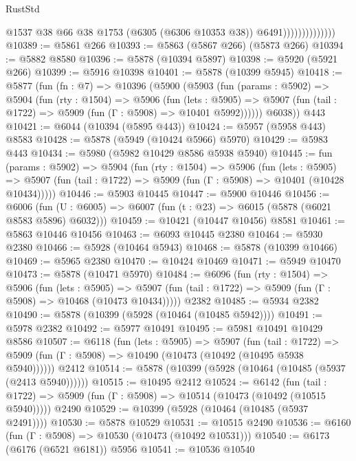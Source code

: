 \begin{lexlean}{RustStd}
\begin{coremodule}
                                @1537
                                @38
                                @66
                                @38
                                @1753
                                (@6305 (@6306 @10353 @38))
                                @6491))))))))))))))
@10389 := @5861 @266
@10393 := @5863 (@5867 @266) (@5873 @266)
@10394 := @5882 @8580
@10396 := @5878 (@10394 @5897)
@10398 := @5920 (@5921 @266)
@10399 := @5916 @10398
@10401 := @5878 (@10399 @5945)
@10418 := @5877
    (fun (fn : @7) =>
    @10396
      (@5900
        (@5903
          (fun (params : @5902) =>
          @5904
            (fun (rty : @1504) =>
            @5906
              (fun (lets : @5905) =>
              @5907 (fun (tail : @1722) => @5909 (fun (Γ : @5908) => @10401 @5992))))))
        @6038))
    @443
@10421 := @6044 (@10394 (@5895 @443))
@10424 := @5957 (@5958 @443) @8583
@10428 := @5878 (@5949 (@10424 @5966) @5970)
@10429 := @5983 @443
@10434 := @5980 (@5982 @10429 @8586 @5938 @5940)
@10445 := fun (params : @5902) =>
  @5904
    (fun (rty : @1504) =>
    @5906
      (fun (lets : @5905) =>
      @5907 (fun (tail : @1722) => @5909 (fun (Γ : @5908) => @10401 (@10428 @10434)))))
@10446 := @5903 @10445
@10447 := @5900 @10446
@10456 := @6006
    (fun (U : @6005) => @6007 (fun (t : @23) => @6015 (@5878 (@6021 @8583 @5896) @6032)))
@10459 := @10421 (@10447 @10456) @8581
@10461 := @5863 @10446 @10456
@10463 := @6093 @10445 @2380
@10464 := @5930 @2380
@10466 := @5928 (@10464 @5943)
@10468 := @5878 (@10399 @10466)
@10469 := @5965 @2380
@10470 := @10424 @10469
@10471 := @5949 @10470
@10473 := @5878 (@10471 @5970)
@10484 := @6096
    (fun (rty : @1504) =>
    @5906
      (fun (lets : @5905) =>
      @5907 (fun (tail : @1722) => @5909 (fun (Γ : @5908) => @10468 (@10473 @10434)))))
    @2382
@10485 := @5934 @2382
@10490 := @5878 (@10399 (@5928 (@10464 (@10485 @5942))))
@10491 := @5978 @2382
@10492 := @5977 @10491
@10495 := @5981 @10491 @10429 @8586
@10507 := @6118
    (fun (lets : @5905) =>
    @5907
      (fun (tail : @1722) =>
      @5909 (fun (Γ : @5908) => @10490 (@10473 (@10492 (@10495 @5938 @5940))))))
    @2412
@10514 := @5878 (@10399 (@5928 (@10464 (@10485 (@5937 (@2413 @5940))))))
@10515 := @10495 @2412
@10524 := @6142
    (fun (tail : @1722) => @5909 (fun (Γ : @5908) => @10514 (@10473 (@10492 (@10515 @5940)))))
    @2490
@10529 := @10399 (@5928 (@10464 (@10485 (@5937 @2491))))
@10530 := @5878 @10529
@10531 := @10515 @2490
@10536 := @6160 (fun (Γ : @5908) => @10530 (@10473 (@10492 @10531)))
@10540 := @6173 (@6176 (@6521 @6181)) @5956
@10541 := @10536 @10540

\end{coremodule}
\end{lexlean}
